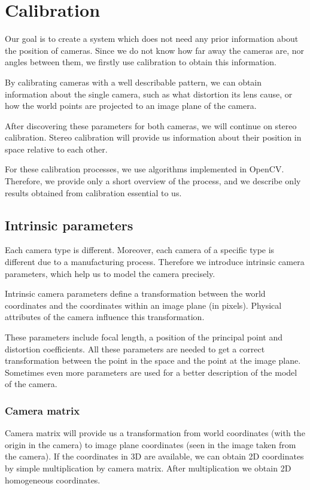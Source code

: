 \chapter{Calibration}

Our goal is to create a system which does not need any prior information about the
position of cameras. Since we do not know how far away the cameras are, nor
angles between them, we firstly use calibration to obtain this information.

By calibrating cameras with a well describable pattern, we can obtain
information about the single camera, such as what distortion its lens cause, or
how the world points are projected to an image plane of the camera.

After discovering these parameters for both cameras, we will continue on stereo
calibration. Stereo calibration will provide us information about their
position in space relative to each other.

For these calibration processes, we use algorithms implemented in OpenCV.
Therefore, we provide only a short overview of the process, and we describe
only results obtained from calibration essential to us.

\section{Intrinsic parameters}

Each camera type is different. Moreover, each camera of a specific type is
different due to a manufacturing process. Therefore we introduce intrinsic
camera parameters, which help us to model the camera precisely.

Intrinsic camera parameters define a transformation between the world coordinates and
the coordinates within an image plane (in pixels). Physical attributes of the
camera influence this transformation.

These parameters include focal length, a position of the principal point and
distortion coefficients. All these parameters are needed to get a correct
transformation between the point in the space and the point at the image plane.
Sometimes even more parameters are used for a better description of the model
of the camera.

\subsection{Camera matrix} 

Camera matrix will provide us a transformation from
world coordinates (with the origin in the camera) to image plane coordinates
(seen in the image taken from the camera). If the coordinates in 3D are
available, we can obtain 2D coordinates by simple multiplication by camera
matrix. After multiplication we obtain 2D homogeneous coordinates.

